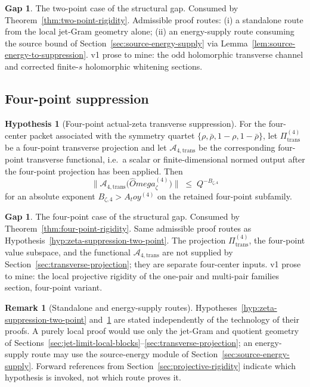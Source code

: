 \documentclass[11pt,a4paper]{amsart}
\def\Omega{Omega}%
\def\toy{toy}%
\numberwithin{equation}{section}
\theoremstyle{plain}
\theoremstyle{definition}
\newtheorem{remark}[theorem]{Remark}
\newtheorem{hypothesis}[theorem]{Hypothesis}
\newcommand{\z}{\zeta}
\newcommand{\Om}{\Omega}
\newcommand{\toy}{\mathrm{toy}}
\newcommand{\trans}{\mathrm{trans}}
\newtheorem{wip}[theorem]{Gap}
\begin{document}
\begin{wip}\label{rem:wip-zeta-suppression-two-point}
The two-point case of the structural gap.  Consumed by
Theorem~\ref{thm:two-point-rigidity}.  Admissible proof routes:
\textup{(i)} a standalone route from the local jet-Gram geometry alone;
\textup{(ii)} an energy-supply route consuming the source bound
of Section~\ref{sec:source-energy-supply} via
Lemma~\ref{lem:source-energy-to-suppression}.  v1 prose to mine: the
odd holomorphic transverse channel and corrected finite-\(s\)
holomorphic whitening sections.
\end{wip}

\subsection{Four-point suppression}
\label{subsec:four-point-suppression}

\begin{hypothesis}[Four-point actual-zeta transverse suppression]
\label{hyp:zeta-suppression-four-point}
For the four-center packet associated with the symmetry quartet
\(\{\rho,\bar\rho,1-\rho,1-\bar\rho\}\), let
\(\Pi_\trans^{(4)}\) be a four-point transverse projection and let
\(\mathcal A_{4,\trans}\) be the corresponding four-point transverse
functional, i.e.\ a scalar or finite-dimensional normed output after
the four-point projection has been applied.  Then
\begin{equation}
\label{eq:zeta-suppression-four-point-transverse}
        \bigl\|\mathcal A_{4,\trans}\bigl(\widehat\Om_\z^{(4)}\bigr)\bigr\|
        \;\le\; Q^{-B_{\z,4}}
\end{equation}
for an absolute exponent \(B_{\z,4}>A_\toy^{(4)}\) on the retained
four-point subfamily.
\end{hypothesis}

\begin{wip}\label{rem:wip-zeta-suppression-four-point}
The four-point case of the structural gap.  Consumed by
Theorem~\ref{thm:four-point-rigidity}.  Same admissible proof routes
as Hypothesis~\ref{hyp:zeta-suppression-two-point}.  The projection
\(\Pi_\trans^{(4)}\), the four-point value subspace, and the
functional \(\mathcal A_{4,\trans}\) are not supplied by
Section~\ref{sec:transverse-projection}; they are separate
four-center inputs.  v1 prose to mine: the local projective rigidity
of the one-pair and multi-pair families section, four-point variant.
\end{wip}

\begin{remark}[Standalone and energy-supply routes]
\label{rem:standalone-and-energy-supply-routes}
Hypotheses~\ref{hyp:zeta-suppression-two-point}
and~\ref{hyp:zeta-suppression-four-point} are stated independently of
the technology of their proofs.  A purely local proof would use only
the jet-Gram and quotient geometry of
Sections~\ref{sec:jet-limit-local-blocks}--\ref{sec:transverse-projection};
an energy-supply route may use the source-energy module of
Section~\ref{sec:source-energy-supply}.  Forward references from
Section~\ref{sec:projective-rigidity} indicate which hypothesis is
invoked, not which route proves it.
\end{remark}
\end{document}
